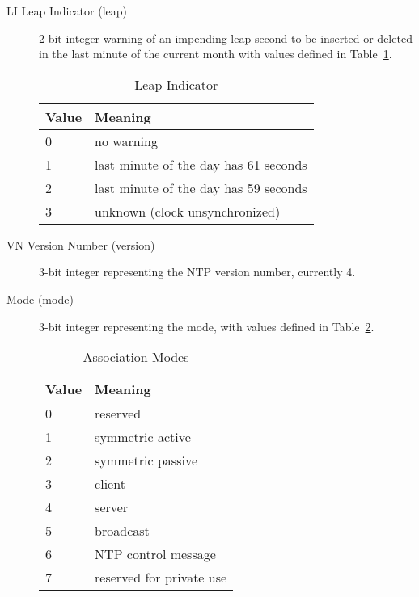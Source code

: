 \begin{description}

  \item[LI Leap Indicator (leap)] 2-bit integer warning of an impending leap
    second to be inserted or deleted in the last minute of the current
    month with values defined in Table~\ref{leap_indicator}.

    \begin{table}[htb]
      \center
      \begin{tabular}{| l | l |}
        \hline
        Value & Meaning \\
        \hline
        \hline
        0 & no warning \\
        1 & last minute of the day has 61 seconds \\
        2 & last minute of the day has 59 seconds \\
        3 & unknown (clock unsynchronized) \\
        \hline
      \end{tabular}
      \caption{Leap Indicator}
      \label{leap_indicator}
    \end{table}

  \item[VN Version Number (version)] 3-bit integer representing the NTP
    version number, currently 4.

  \item[Mode (mode)] 3-bit integer representing the mode, with values defined
    in Table~\ref{association_modes}.

    \begin{table}[htb]
      \center
      \begin{tabular}{| l | l |}
        \hline
        Value & Meaning \\
        \hline
        \hline
        0 & reserved \\
        1 & symmetric active \\
        2 & symmetric passive \\
        3 & client \\
        4 & server \\
        5 & broadcast \\
        6 & NTP control message \\
        7 & reserved for private use \\
        \hline
      \end{tabular}
      \caption{Association Modes}
      \label{association_modes}
    \end{table}


\end{description}
